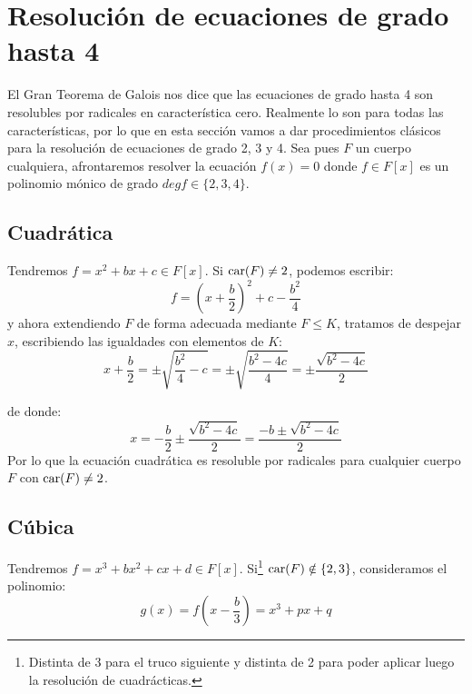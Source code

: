 \section{Resolución de ecuaciones de grado hasta 4} %
\noindent
El Gran Teorema de Galois nos dice que las ecuaciones de grado hasta 4 son resolubles por radicales en característica cero. Realmente lo son para todas las características, por lo que en esta sección vamos a dar procedimientos clásicos para la resolución de ecuaciones de grado 2, 3 y 4. Sea pues $F$ un cuerpo cualquiera, afrontaremos resolver la ecuación $f(x) = 0$ donde $f\in F[x]$  es un polinomio mónico de grado $degf \in \{2,3,4\}$.

\subsection{Cuadrática}
\noindent
Tendremos $f=x^2+bx+c\in F[x]$. Si $\operatorname{car}(F) \neq 2$, podemos escribir:
\begin{equation*}
    f = {\left(x+\frac{b}{2}\right)}^{2} + c - \frac{b^2}{4}
\end{equation*}
y ahora extendiendo $F$ de forma adecuada mediante $F\leq K$, tratamos de despejar $x$, escribiendo las igualdades con elementos de $K$:
\begin{equation*}
    x + \frac{b}{2} = \pm\sqrt{\frac{b^2}{4}-c} = \pm\sqrt{\frac{b^2-4c}{4}} = \pm\frac{\sqrt{b^2-4c}}{2}
\end{equation*}

de donde:
\begin{equation*}
    x = -\frac{b}{2}\pm \frac{\sqrt{b^2-4c}}{2} = \frac{-b\pm \sqrt{b^2 -4c}}{2}
\end{equation*}
Por lo que la ecuación cuadrática es resoluble por radicales para cualquier cuerpo $F$ con $\operatorname{car}(F)\neq 2$.

\subsection{Cúbica}
\noindent
Tendremos $f=x^3+bx^2+cx+d\in F[x]$. Si\footnote{Distinta de 3 para el truco siguiente y distinta de 2 para poder aplicar luego la resolución de cuadrácticas.} $\operatorname{car}(F)\notin \{2,3\}$, consideramos el polinomio:
\begin{equation*}
    g(x) = f\left(x-\frac{b}{3}\right) = x^3+px+q
\end{equation*}

